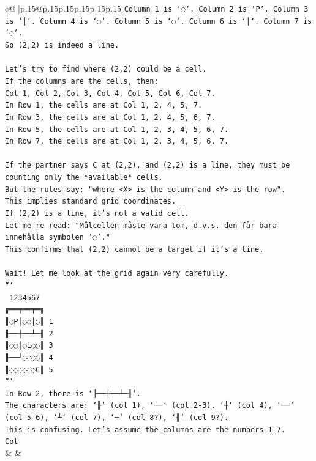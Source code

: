 \documentclass{article}
\begin{document}
{\begin{supertabular}{c@{$\;$}|p{.15\linewidth}@{}p{.15\linewidth}p{.15\linewidth}p{.15\linewidth}p{.15\linewidth}p{.15\linewidth}}
{{{\texttt{Column 1 is `◌`. Column 2 is `P`. Column 3 is `│`. Column 4 is `◌`. Column 5 is `◌`. Column 6 is `│`. Column 7 is `◌`.} \\
\texttt{So (2,2) is indeed a line.} \\
\\ 
\texttt{Let's try to find where (2,2) could be a cell.} \\
\texttt{If the columns are the cells, then:} \\
\texttt{Col 1, Col 2, Col 3, Col 4, Col 5, Col 6, Col 7.} \\
\texttt{In Row 1, the cells are at Col 1, 2, 4, 5, 7.} \\
\texttt{In Row 3, the cells are at Col 1, 2, 4, 5, 6, 7.} \\
\texttt{In Row 5, the cells are at Col 1, 2, 3, 4, 5, 6, 7.} \\
\texttt{In Row 7, the cells are at Col 1, 2, 3, 4, 5, 6, 7.} \\
\\ 
\texttt{If the partner says C at (2,2), and (2,2) is a line, they must be counting only the *available* cells.} \\
\texttt{But the rules say: "where <X> is the column and <Y> is the row".} \\
\texttt{This implies standard grid coordinates.} \\
\texttt{If (2,2) is a line, it's not a valid cell.} \\
\texttt{Let me re{-}read: "Målcellen måste vara tom, d.v.s. den får bara innehålla symbolen '◌'."} \\
\texttt{This confirms that (2,2) cannot be a target if it's a line.} \\
\\ 
\texttt{Wait! Let me look at the grid again very carefully.} \\
\texttt{```} \\
\texttt{ 1234567} \\
\texttt{╔══╤══╤═╗} \\
\texttt{║◌P│◌◌│◌║ 1} \\
\texttt{╟──┼──┴─╢ 2} \\
\texttt{║◌◌│◌L◌◌║ 3} \\
\texttt{╟──┘◌◌◌◌║ 4} \\
\texttt{║◌◌◌◌◌◌C║ 5} \\
\texttt{```} \\
\texttt{In Row 2, there is `╟──┼──┴─╢`.} \\
\texttt{The characters are: `╟` (col 1), `──` (col 2{-}3), `┼` (col 4), `──` (col 5{-}6), `┴` (col 7), `─` (col 8?), `╢` (col 9?).} \\
\texttt{This is confusing. Let's assume the columns are the numbers 1{-}7.} \\
\texttt{Col} \\
            }
        }
    }
    & & \\ \\


\end{supertabular}}
\end{document}
